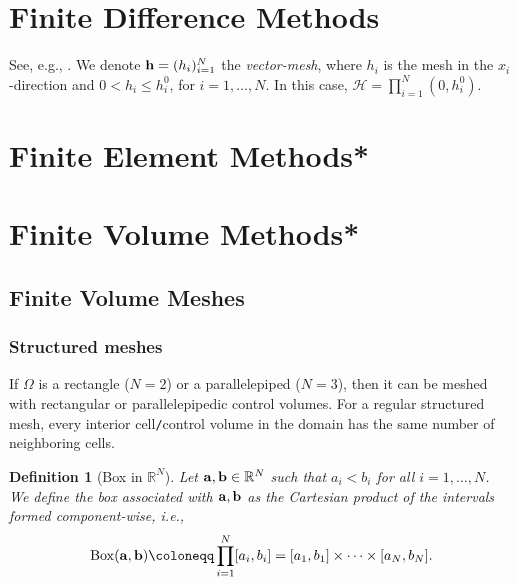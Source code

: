 \documentclass[oneside,11pt]{book}
\numberwithin{equation}{section}
\newtheorem{definition}{Definition}[section]
\begin{document}
\section{Finite Difference Methods}
See, e.g., \cite{LeVeque2007}. We denote ${\bf h} = (h_i)_{i=1}^N$ the \textit{vector-mesh}, where $h_i$ is the mesh in the $x_i$-direction and $0 < h_i\le h_i^0$, for $i = 1,\ldots,N$. In this case, $\mathcal{H} = \prod_{i=1}^N (0,h_i^0)$.

\section{Finite Element Methods*}

\section{Finite Volume Methods*}

\subsection{Finite Volume Meshes}

\subsubsection{Structured meshes}
If $\Omega$ is a rectangle ($N = 2$) or a parallelepiped ($N = 3$), then it can be meshed with rectangular or parallelepipedic control volumes. For a regular structured mesh, every interior cell\texttt{/}control volume in the domain has the same number of neighboring cells.

\begin{definition}[Box in $\mathbb{R}^N$]
    Let ${\bf a},{\bf b}\in\mathbb{R}^N$ such that $a_i < b_i$ for all $i = 1,\ldots,N$. We define the box associated with ${\bf a},{\bf b}$ as the Cartesian product of the intervals formed component-wise, i.e.,
    \begin{align*}
        \operatorname{Box}({\bf a},{\bf b})\coloneqq\prod_{i=1}^N [a_i,b_i] = [a_1,b_1]\times\cdots\times[a_N,b_N].
    \end{align*}
\end{definition}
\end{document}
